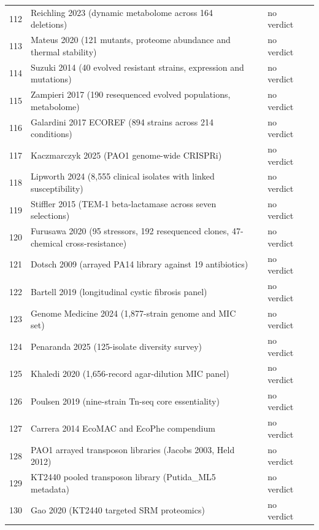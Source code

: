\begin{longtable}{@{}r L{76mm} L{20mm} L{36mm} L{24mm}@{}}
112 & Reichling 2023 (dynamic metabolome across 164 deletions) &  & no verdict &  \\
113 & Mateus 2020 (121 mutants, proteome abundance and thermal stability) &  & no verdict &  \\
114 & Suzuki 2014 (40 evolved resistant strains, expression and mutations) &  & no verdict &  \\
115 & Zampieri 2017 (190 resequenced evolved populations, metabolome) &  & no verdict &  \\
116 & Galardini 2017 ECOREF (894 strains across 214 conditions) &  & no verdict &  \\
117 & Kaczmarczyk 2025 (PAO1 genome-wide CRISPRi) &  & no verdict &  \\
118 & Lipworth 2024 (8,555 clinical isolates with linked susceptibility) &  & no verdict &  \\
119 & Stiffler 2015 (TEM-1 beta-lactamase across seven selections) &  & no verdict &  \\
120 & Furusawa 2020 (95 stressors, 192 resequenced clones, 47-chemical cross-resistance) &  & no verdict &  \\
121 & Dotsch 2009 (arrayed PA14 library against 19 antibiotics) &  & no verdict &  \\
122 & Bartell 2019 (longitudinal cystic fibrosis panel) &  & no verdict &  \\
123 & Genome Medicine 2024 (1,877-strain genome and MIC set) &  & no verdict &  \\
124 & Penaranda 2025 (125-isolate diversity survey) &  & no verdict &  \\
125 & Khaledi 2020 (1,656-record agar-dilution MIC panel) &  & no verdict &  \\
126 & Poulsen 2019 (nine-strain Tn-seq core essentiality) &  & no verdict &  \\
127 & Carrera 2014 EcoMAC and EcoPhe compendium &  & no verdict &  \\
128 & PAO1 arrayed transposon libraries (Jacobs 2003, Held 2012) &  & no verdict &  \\
129 & KT2440 pooled transposon library (Putida\_ML5 metadata) &  & no verdict &  \\
130 & Gao 2020 (KT2440 targeted SRM proteomics) &  & no verdict &  \\

\end{longtable}
